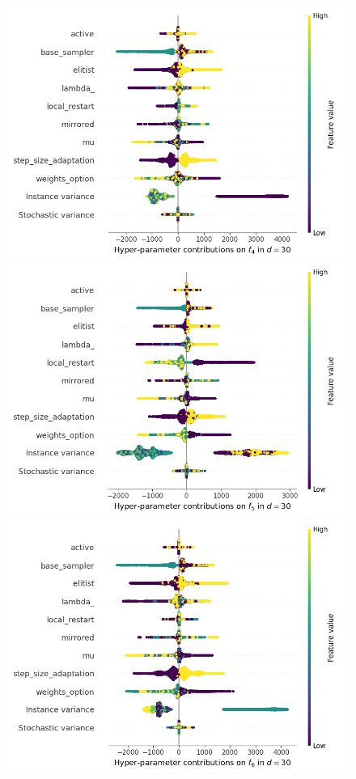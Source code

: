 \begin{figure}[t]
	\includegraphics[height=0.15\textheight,trim=60mm 0mm 0mm 0mm,clip]{cma_img_new/img_summary_f4_d30.png}
	\includegraphics[height=0.15\textheight,trim=0mm 0mm 30mm 0mm,clip]{cma_img_new/img_summary_f5_d30.png}
	\includegraphics[height=0.15\textheight,trim=60mm 0mm 30mm 0mm,clip]{cma_img_new/img_summary_f6_d30.png}

\end{figure}

